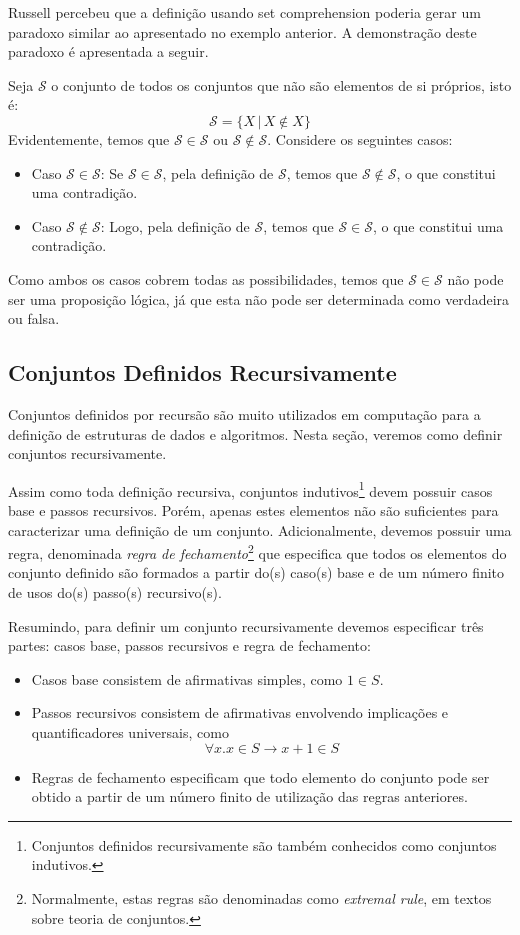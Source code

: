 Russell percebeu que a definição usando set comprehension poderia
gerar um paradoxo similar ao apresentado no exemplo
anterior. A demonstração deste paradoxo é apresentada a seguir.

Seja $\mathcal{S}$ o conjunto de todos os conjuntos que não
são elementos de si próprios, isto é:
\[\mathcal{S} =\{X\,|\,X\not\in X\}\]
Evidentemente, temos que $\mathcal{S} \in \mathcal{S}$ ou $\mathcal{S}
\not\in \mathcal{S}$. Considere os seguintes casos:
\begin{itemize}
  \item Caso $\mathcal{S} \in \mathcal{S}$: Se $\mathcal{S} \in
    \mathcal{S}$, pela definição de $\mathcal{S}$, temos que
    $\mathcal{S} \not\in \mathcal{S}$, o que constitui uma contradição.
  \item Caso $\mathcal{S} \not\in \mathcal{S}$: Logo, pela definição
    de $\mathcal{S}$, temos que $\mathcal{S} \in \mathcal{S}$, o que
    constitui uma contradição.
\end{itemize}
Como ambos os casos cobrem todas as possibilidades, temos que
$\mathcal{S}\in\mathcal{S}$ não pode ser uma proposição lógica, já que
esta não pode ser determinada como verdadeira ou falsa.

\subsection{Conjuntos Definidos Recursivamente}

Conjuntos definidos por recursão são muito utilizados em computação
para a definição de estruturas de dados e algoritmos. Nesta seção,
veremos como definir conjuntos recursivamente.

Assim como toda definição recursiva, conjuntos
indutivos\footnote{Conjuntos definidos recursivamente são também conhecidos
  como conjuntos indutivos.} devem possuir casos base e passos
recursivos. Porém, apenas estes elementos não são suficientes para
caracterizar uma definição de um conjunto. Adicionalmente, devemos
possuir uma regra, denominada \emph{regra de
  fechamento}\footnote{Normalmente, estas regras são denominadas como
  \emph{extremal rule}, em textos sobre teoria de conjuntos.} que
especifica que todos os elementos do conjunto definido são formados a
partir do(s) caso(s) base e de um número finito de usos do(s)
passo(s) recursivo(s).

Resumindo, para definir um conjunto recursivamente devemos especificar
três partes: casos base, passos recursivos e regra de fechamento:
\begin{itemize}
  \item Casos base consistem de afirmativas simples, como $1\in S$.
   \item Passos recursivos consistem de afirmativas envolvendo
     implicações e quantificadores universais, como \[\forall x. x\in
     S \to x + 1 \in S\]
   \item Regras de fechamento especificam que todo elemento do
     conjunto pode ser obtido a partir de um número finito de
     utilização das regras anteriores.
\end{itemize}


